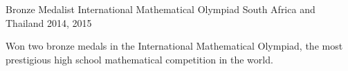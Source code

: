 


\begin{cventries}


  \cventry
  {Bronze Medalist} %
  {International Mathematical Olympiad} %
  {South Africa and Thailand} %
  {2014, 2015} %
  { %
    \begin{cvitems}
    \item {Won two bronze medals in the International Mathematical Olympiad, the most prestigious high school mathematical competition in the world.}
    \end{cvitems}
  }

\end{cventries}

